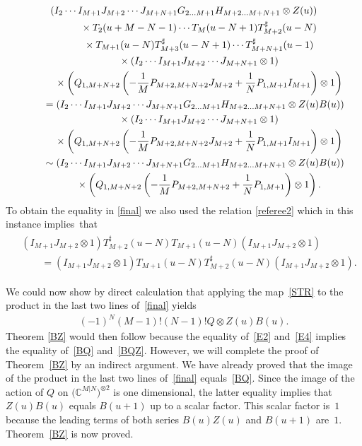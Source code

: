 \documentclass[pdftex]{sigma}
\numberwithin{equation}{section}
\def\CC{{\mathbb{C}}}
\def\CMN{\CC^{M|N}}
\def\ot{\otimes}
\def\TS{T^{\sharp}}
\begin{document}
\begin{gather}
( I_{2} \cdots I_{M+1}
J_{M+2} \cdots J_{M+N+1}
G_{2 \dots M+1} H_{M+2 \dots M+N+1}\ot Z(u) )\notag
\\ \qquad\quad{} \times
T_2 (u+M-N-1) \cdots T_{M} (u-N+1)
\TS_{M+2} (u-N)\notag
\\ \qquad\quad{} \times
T_{M+1} (u-N)
\TS_{M+3} (u-N+1) \cdots \TS_{M+N+1} (u-1)\notag
\\ \qquad\quad{} \times
( I_{2} \cdots I_{M+1}
J_{M+2} \cdots J_{M+N+1}\ot1 )\notag
\\ \qquad\quad{} \times
\left( Q_{1,M+N+2}
\left(- \frac1M P_{M+2,M+N+2} J_{M+2}+
\frac1N P_{1,M+1} I_{M+1} \right)\ot1 \right) \notag
\\ \qquad{} =
( I_{2} \cdots I_{M+1}
J_{M+2} \cdots J_{M+N+1}
G_{2 \dots M+1} H_{M+2 \dots M+N+1}\ot
Z(u) B(u) )\notag
\\ \qquad\quad{} \times
( I_{2} \cdots I_{M+1}
J_{M+2} \cdots J_{M+N+1}\ot1 )\notag
\\ \qquad\quad{}\times
\left( Q_{1,M+N+2}
\left(- \frac1M P_{M+2,M+N+2} J_{M+2}+
\frac1N P_{1,M+1} I_{M+1} \right)\ot1 \right)\notag
\\ \qquad{} \sim
( I_{2} \cdots I_{M+1}
J_{M+2} \cdots J_{M+N+1}
G_{2 \dots M+1} H_{M+2 \dots M+N+1}\ot
Z(u) B(u) )\notag
\\ \qquad\quad{} \times
\left( Q_{1,M+N+2}
\left(- \frac1M P_{M+2,M+N+2}+
\frac1N P_{1,M+1} \right)\ot1 \right) . \label{final}
\end{gather}
To obtain the equality in \eqref{final} we also used the relation
\eqref{referee2} which in this instance implies~that
\begin{gather*}
\begin{split}&
( I_{M+1} J_{M+2}\ot1 )\TS_{M+2} (u-N) T_{M+1} (u-N)
( I_{M+1} J_{M+2}\ot1 )\\
& \qquad{} =( I_{M+1} J_{M+2}\ot1 )
T_{M+1} (u-N) \TS_{M+2} (u-N)
( I_{M+1} J_{M+2}\ot1 ) .
\end{split}
\end{gather*}

We could now show by direct calculation that applying the map~\eqref{STR}
to the product in the last two lines of~\eqref{final} yields
\begin{gather}\label{BQZ}
(-1)^N (M-1) ! (N-1) ! Q\ot Z(u) B(u) .
\end{gather}
Theorem \ref{BZ}  would then follow because the equality of~\eqref{E2} and~\eqref{E4} implies the equality of~\eqref{BQ} and~\eqref{BQZ}. However, we will complete the proof of Theorem~\ref{BZ} by an indirect
argument. We have already proved that the image of the product in
the last two lines of~\eqref{final} equals~\eqref{BQ}.
Since the image of the action of $Q$ on $\big(\CMN\big)^{\ot 2}$
is one dimensional, the latter equality implies that $Z(u) B(u)$ equals $B(u+1)$ up to a scalar factor.
This scalar factor is~$1$ because the leading terms of both
series $B(u) Z(u)$ and $B(u+1)$ are~$1$. Theorem~\ref{BZ} is now proved.
\end{document}
